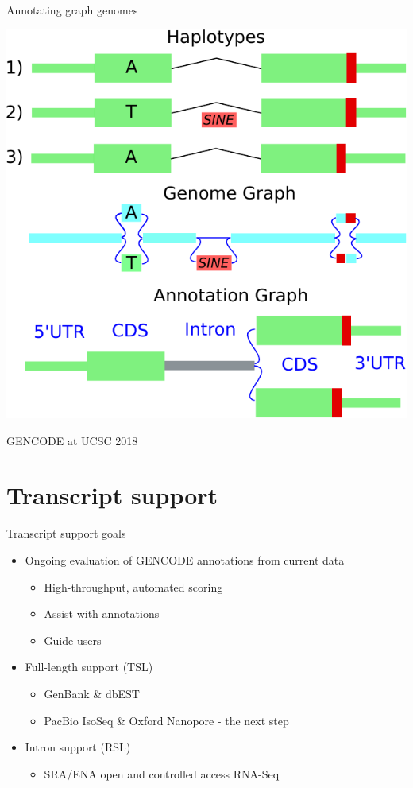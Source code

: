 \documentclass[10pt,
               hyperref={bookmarks=false,
                         bookmarksopen=false,
                         colorlinks=true,
                         linkcolor=blue,
                         urlcolor=blue},
               xcolor={svgnames,table}]{beamer}
\newcommand{\sectionframe}[1]{
  \begin{frame}{\thetitle}
    \section{#1}
  \end{frame}
}
\newenvironment{tightitemize}{%
\begin{itemize}
  \setlength{\itemsep}{1pt}%
  \setlength{\parskip}{0pt}%
  \setlength{\parsep}{0pt}%
}{\end{itemize}}
\newcommand{\thetitle}{GENCODE at UCSC 2018}
\begin{document}
\begin{frame}{Annotating graph genomes}
  \begin{center}
    \includegraphics[scale=0.65]{images/graph-annotation.pdf}
  \end{center}
\end{frame}

\sectionframe{Transcript support}
\begin{frame}{Transcript support goals}
  \begin{itemize}
  \item Ongoing evaluation of GENCODE annotations from current data
    \begin{tightitemize}
    \item High-throughput, automated scoring
    \item Assist with annotations
    \item Guide users
    \end{tightitemize}
  \item Full-length support (TSL)
    \begin{tightitemize}
    \item GenBank \& dbEST 
    \item PacBio IsoSeq \& Oxford Nanopore - the next step
    \end{tightitemize}
  \item Intron support (RSL)
    \begin{tightitemize}
    \item SRA/ENA open and controlled access RNA-Seq
    \end{tightitemize}
  \end{itemize}
\end{frame}
\end{document}
